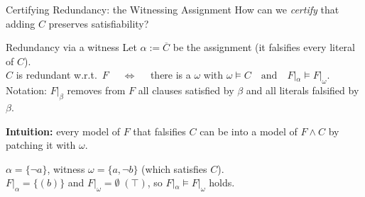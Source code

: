 \documentclass[t]{sdqbeamer}
\begin{document}
\begin{frame}{Certifying Redundancy: the Witnessing Assignment}
How can we \emph{certify} that adding $C$ preserves satisfiability?\\[1ex]
\begin{block}{Redundancy via a witness}
Let $\alpha := \overline C$ be the assignment  (it falsifies every literal of $C$).\\[1ex]
$C$ is redundant w.r.t.\ $F$ $\quad\iff\quad$ there is a  $\omega$ \quad with $\omega \models C \quad \text{and} \quad F|_\alpha \models F|_\omega.$\\[1ex]
{\small Notation: $F|_\beta$ removes from $F$ all clauses satisfied by $\beta$ and all literals falsified by $\beta$.}
\end{block}
\textbf{Intuition:} every model of $F$ that falsifies $C$ can be  into a model of $F \land C$ by patching it with $\omega$.
~\\[1em]
\begin{example}[Witness for $C=(a)$ in $F=\bigl\{(a\lor b),(\lnot a\lor \lnot b)\bigr\}$]
$\alpha = \{\lnot a\}$, \quad witness $\omega = \{a, \lnot b\}$ (which satisfies $C$).\\[1ex]
$F|_\alpha = \bigl\{(b)\bigr\}$ \quad and \quad $F|_\omega = \emptyset\;(\top)$, \quad so $F|_\alpha \models F|_\omega$ holds.
\end{example}
\end{frame}
\end{document}
